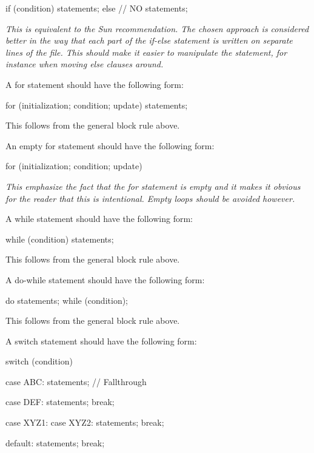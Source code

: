 \documentclass[a4paper,11pt,oneside]{scrbook}
\newcommand{\motivation}[1]{{\normalfont \itshape #1}}
\newcommand{\trcode}[1]{{\normalfont \ttfamily #1}}
\begin{document}
\begin{code}
  if (condition) {
    statements;
  } else {        // NO
    statements;
  }
\end{code}

\motivation{
  This is equivalent to the Sun recommendation. The chosen approach is
  considered better in the way that each part of the \trcode{if-else} statement
  is written on separate lines of the file. This should make it easier
  to manipulate the statement, for instance when moving else clauses
  around.
}

A for statement should have the following form: 

\begin{code}
  for (initialization; condition; update) {
    statements;
  }
\end{code}

This follows from the general block rule above.

An empty for  statement should have the following form: 

\begin{code}
  for (initialization; condition; update) {
  }
\end{code}

\motivation{
  This emphasize the fact that the for statement is empty and it makes
  it obvious for the reader that this is intentional. Empty loops should
  be avoided however.
}

A while  statement should have the following form: 

\begin{code}
  while (condition) {
    statements;
  }
\end{code}

This follows from the general block rule above.  

A do-while  statement should have the following form: 

\begin{code}
  do {
    statements;
  } while (condition);
\end{code}

This follows from the general block rule above.

A switch  statement should have the following form: 

\begin{code}
  switch (condition) {
    case ABC: 
      statements;
      // Fallthrough

    case DEF: 
      statements;
      break;

    case XYZ1: 
    case XYZ2: 
      statements;
      break;

    default: 
      statements;
      break;
  }
\end{code}
\end{document}
